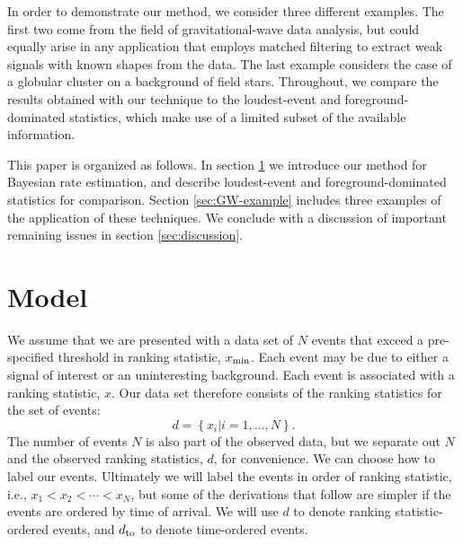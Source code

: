 \documentclass[aps,prd]{revtex4-1}
\newcommand{\mathset}[1]{\left\{ #1 \right\}}
\begin{document}
In order to demonstrate our method, we consider three different
examples.  The first two come from the field of gravitational-wave
data analysis, but could equally arise in any application that employs
matched filtering \cite{findchirppaper} to extract weak signals with
known shapes from the data.  The last example considers the case of a
globular cluster on a background of field stars.  Throughout, we
compare the results obtained with our technique to the loudest-event
and foreground-dominated statistics, which make use of a limited
subset of the available information.

This paper is organized as follows.  In section \ref{sec:model} we
introduce our method for Bayesian rate estimation, and describe
loudest-event and foreground-dominated statistics for comparison.
Section \ref{sec:GW-example} includes three examples of the
application of these techniques.  We conclude with a discussion of
important remaining issues in section \ref{sec:discussion}.




\section{Model}\label{sec:model}

We assume that we are presented with a data set of $N$ events that
exceed a pre-specified threshold in ranking statistic, $x_{\rm min}$.
Each event may be due to either a signal of interest or an
uninteresting background.  Each event is associated with a ranking
statistic, $x$.  Our data set therefore consists of the ranking
statistics for the set of events:
\begin{equation}
  d = \mathset{ x_i | i = 1, \ldots, N } .
\end{equation}
The number of events $N$ is also part of the observed data, but we
separate out $N$ and the observed ranking statistics, $d$, for
convenience. We can choose how to label our events. Ultimately we will
label the events in order of ranking statistic, i.e., $x_1 < x_2 <
\cdots < x_N$, but some of the derivations that follow are simpler if
the events are ordered by time of arrival. We will use $d$ to denote
ranking statistic-ordered events, and $d_{\rm to}$ to denote
time-ordered events.
\end{document}
